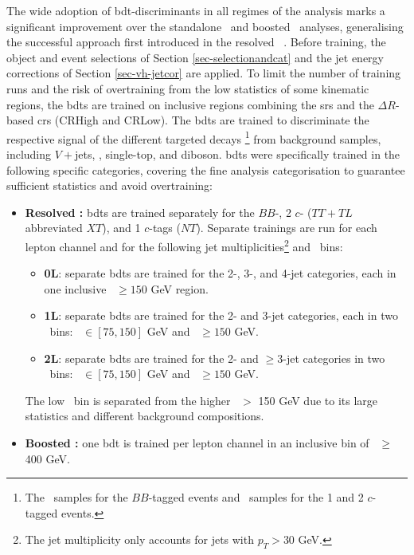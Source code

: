 The wide adoption of \gls{bdt}-discriminants in all regimes of the analysis marks a significant improvement over the standalone \vhc\ and boosted \vhb\ analyses, generalising the successful approach first introduced in the resolved \vhb\ \cite{ATLAS:2020fcp}. Before training, the object and event selections of Section \ref{sec-selectionandcat} and the jet energy corrections of Section \ref{sec-vh-jetcor} are applied. To limit the number of training runs and the risk of overtraining from the low statistics of some kinematic regions, the \glspl{bdt} are trained on inclusive regions combining the \glspl{sr} and the $\Delta R$-based \glspl{cr} (CRHigh and CRLow). The \glspl{bdt} are trained to discriminate the respective signal of the different targeted decays \footnote{The \vhb\ samples for the $BB$-tagged events and \vhc\ samples for the 1 and 2 $c$-tagged events.} from background samples, including $V+$jets, \ttb, single-top, and diboson. \glspl{bdt} were specifically trained in the following specific categories, covering the fine analysis categorisation to guarantee sufficient statistics and avoid overtraining:
\begin{itemize}[leftmargin=*]
  \item \textbf{Resolved \boldvhbc:} \glspl{bdt} are trained separately for the $BB$-, 2 $c$- ($TT+TL$ abbreviated $XT$), and 1 $c$-tags ($NT$). Separate trainings are run for each lepton channel and for the following jet multiplicities\footnote{The jet multiplicity only accounts for jets with $p_T > 30$ GeV.} and \ptv\ bins:
  \begin{itemize}
      \item \textbf{0L}: separate \glspl{bdt} are trained for the 2-, 3-, and 4-jet categories, each in one inclusive \ptv\ $\geq 150$ GeV region.
      \item \textbf{1L}: separate \glspl{bdt} are trained for the 2- and 3-jet categories, each in two \ptv\ bins: \ptv\ $\in [75, 150]$ GeV and \ptv\ $\geq 150$ GeV.
      \item \textbf{2L}: separate \glspl{bdt} are trained for the 2- and $\geq$3-jet categories in two \ptv\ bins: \ptv\ $\in [75, 150]$ GeV and \ptv\ $\geq 150$ GeV.
  \end{itemize}
  The low \ptv\ bin is separated from the higher \ptv\ $>$ 150 GeV due to its large statistics and different background compositions.
  \item \textbf{Boosted \vhb:} one \gls{bdt} is trained per lepton channel in an inclusive bin of \ptv\ $\geq$ 400 GeV.
\end{itemize}

